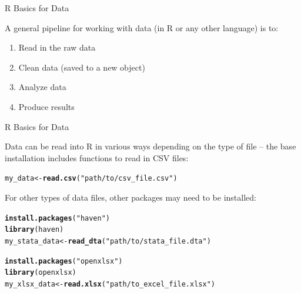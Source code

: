 \documentclass[svgnames,smaller]{beamer}\usepackage[]{graphicx}\usepackage[]{color}
\makeatletter
\newcommand{\hlstr}[1]{\textcolor[rgb]{0.192,0.494,0.8}{#1}}%
\newcommand{\hlstd}[1]{\textcolor[rgb]{0.345,0.345,0.345}{#1}}%
\newcommand{\hlkwb}[1]{\textcolor[rgb]{0.69,0.353,0.396}{#1}}%
\newcommand{\hlkwd}[1]{\textcolor[rgb]{0.737,0.353,0.396}{\textbf{#1}}}%
\newenvironment{kframe}{%
 \def\at@end@of@kframe{}%
 \ifinner\ifhmode%
  \def\at@end@of@kframe{\end{minipage}}%
  \begin{minipage}{\columnwidth}%
 \fi\fi%
 \def\FrameCommand##1{\hskip\@totalleftmargin \hskip-\fboxsep
 \colorbox{shadecolor}{##1}\hskip-\fboxsep
     \hskip-\linewidth \hskip-\@totalleftmargin \hskip\columnwidth}%
 \MakeFramed {\advance\hsize-\width
   \@totalleftmargin\z@ \linewidth\hsize
   \@setminipage}}%
 {\par\unskip\endMakeFramed%
 \at@end@of@kframe}
\newenvironment{knitrout}{}{} %
\makeatother
\begin{document}

\begin{frame}[fragile]{R Basics for Data}

A general pipeline for working with data (in R or any other language) is to: 
\begin{enumerate}
    \item Read in the raw data
    \item Clean data (saved to a new object)
    \item Analyze data
    \item Produce results
\end{enumerate}


\end{frame}


\begin{frame}[fragile]{R Basics for Data}

Data can be read into R in various ways depending on the type of file -- the base installation includes functions to read in CSV files:
\begin{knitrout}\scriptsize
{}\color{fgcolor}\begin{kframe}
\begin{alltt}
\hlstd{my_data} \hlkwb{<-} \hlkwd{read.csv}\hlstd{(}\hlstr{"path/to/csv_file.csv"}\hlstd{)}
\end{alltt}
\end{kframe}
\end{knitrout}

For other types of data files, other packages may need to be installed:
\begin{knitrout}\scriptsize
{}\color{fgcolor}\begin{kframe}
\begin{alltt}
\hlkwd{install.packages}\hlstd{(}\hlstr{"haven"}\hlstd{)}
\hlkwd{library}\hlstd{(haven)}
\hlstd{my_stata_data} \hlkwb{<-} \hlkwd{read_dta}\hlstd{(}\hlstr{"path/to/stata_file.dta"}\hlstd{)}

\hlkwd{install.packages}\hlstd{(}\hlstr{"openxlsx"}\hlstd{)}
\hlkwd{library}\hlstd{(openxlsx)}
\hlstd{my_xlsx_data} \hlkwb{<-} \hlkwd{read.xlsx}\hlstd{(}\hlstr{"path/to_excel_file.xlsx"}\hlstd{)}
\end{alltt}
\end{kframe}
\end{knitrout}


\end{frame}
\end{document}
